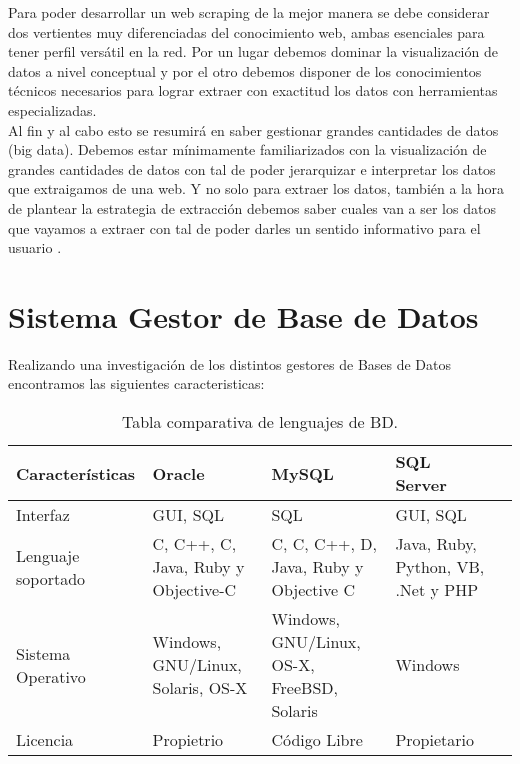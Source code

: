 \begin{itemize}
			
			Para poder desarrollar un web scraping de la mejor manera se debe considerar  dos vertientes muy diferenciadas del conocimiento web, ambas esenciales para tener perfil versátil en la red. Por un lugar debemos dominar la visualización de datos a nivel conceptual y por el otro debemos disponer de los conocimientos técnicos necesarios para lograr extraer con exactitud los datos con herramientas especializadas. \\
			Al fin y al cabo esto se resumirá en saber gestionar grandes cantidades de datos (big data). Debemos estar mínimamente familiarizados con la visualización de grandes cantidades de datos con tal de poder jerarquizar e interpretar los datos que extraigamos de una web. Y no solo para extraer los datos, también a la hora de plantear la estrategia de extracción debemos saber cuales van a ser los datos que vayamos a extraer con tal de poder darles un sentido informativo para el usuario \cite{scraping}.
			
	\end{itemize}
	
	
	\section{Sistema Gestor de Base de Datos}
	\noindent Realizando una investigación de los distintos gestores de Bases de Datos encontramos las siguientes caracteristicas:
	\begin{table}[htbp]
		\begin{center}
			\begin{tabular}{|l|p{35mm}|p{35mm}|p{35mm}|l}
				\hline
				Caracter\'isticas & Oracle & MySQL & SQL Server \\
				\hline 
				Interfaz & GUI, SQL & SQL & GUI, SQL \\ \hline
				Lenguaje soportado & C, C++, C, Java, Ruby y Objective-C & C, C, C++, D, Java, Ruby y Objective C & Java, Ruby, Python, VB, .Net y PHP  \\ \hline
				Sistema Operativo & Windows, GNU/Linux, Solaris, OS-X & Windows, GNU/Linux, OS-X, FreeBSD, Solaris & Windows \\ \hline
				Licencia & Propietrio & Código Libre & Propietario \\ \hline
			\end{tabular}
			\caption{Tabla comparativa de lenguajes de BD.}
			\label{tabla:sencilla}
		\end{center}
	\end{table}
	
